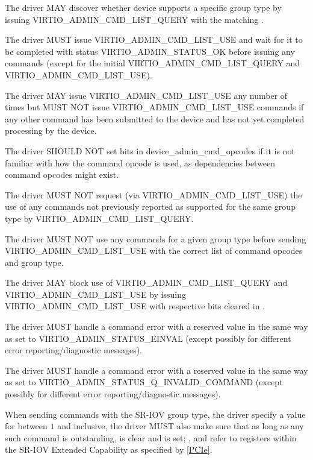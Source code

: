 The driver MAY discover whether device supports a specific group type
by issuing VIRTIO_ADMIN_CMD_LIST_QUERY with the matching
.

The driver MUST issue VIRTIO_ADMIN_CMD_LIST_USE
and wait for it to be completed with status
VIRTIO_ADMIN_STATUS_OK before issuing any commands
(except for the initial VIRTIO_ADMIN_CMD_LIST_QUERY
and VIRTIO_ADMIN_CMD_LIST_USE).

The driver MAY issue VIRTIO_ADMIN_CMD_LIST_USE any number
of times but MUST NOT issue VIRTIO_ADMIN_CMD_LIST_USE commands
if any other command has been submitted to the
device and has not yet completed processing by the device.

The driver SHOULD NOT set bits in device_admin_cmd_opcodes
if it is not familiar with how the command opcode
is used, as dependencies between command opcodes might exist.

The driver MUST NOT request (via VIRTIO_ADMIN_CMD_LIST_USE)
the use of any commands not previously reported as
supported for the same group type by VIRTIO_ADMIN_CMD_LIST_QUERY.

The driver MUST NOT use any commands for a given group type
before sending VIRTIO_ADMIN_CMD_LIST_USE with the correct
list of command opcodes and group type.

The driver MAY block use of VIRTIO_ADMIN_CMD_LIST_QUERY and
VIRTIO_ADMIN_CMD_LIST_USE by issuing VIRTIO_ADMIN_CMD_LIST_USE
with respective bits cleared in .

The driver MUST handle a command error with a reserved 
value in the same way as  set to VIRTIO_ADMIN_STATUS_EINVAL
(except possibly for different error reporting/diagnostic messages).

The driver MUST handle a command error with a reserved
 value in the same way as
 set to
VIRTIO_ADMIN_STATUS_Q_INVALID_COMMAND (except possibly for
different error reporting/diagnostic messages).

When sending commands with the SR-IOV group type,
the driver specify a value for 
between $1$ and  inclusive,
the driver MUST also make sure that as long as any such command
is outstanding,  is clear and
 is set;
,   and
 refer to registers within the SR-IOV Extended
Capability as specified by \hyperref[intro:PCIe]{[PCIe]}.

